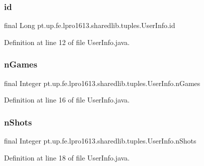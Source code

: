 \subsubsection{\texorpdfstring{id}{id}}
{\footnotesize\ttfamily final Long pt.\+up.\+fe.\+lpro1613.\+sharedlib.\+tuples.\+User\+Info.\+id}



Definition at line 12 of file User\+Info.\+java.

\hypertarget{classpt_1_1up_1_1fe_1_1lpro1613_1_1sharedlib_1_1tuples_1_1_user_info_ace87e94c9ddadfe62cd42182142ee162}{}\label{classpt_1_1up_1_1fe_1_1lpro1613_1_1sharedlib_1_1tuples_1_1_user_info_ace87e94c9ddadfe62cd42182142ee162} 
\subsubsection{\texorpdfstring{n\+Games}{nGames}}
{\footnotesize\ttfamily final Integer pt.\+up.\+fe.\+lpro1613.\+sharedlib.\+tuples.\+User\+Info.\+n\+Games}



Definition at line 16 of file User\+Info.\+java.

\hypertarget{classpt_1_1up_1_1fe_1_1lpro1613_1_1sharedlib_1_1tuples_1_1_user_info_aa892a3fde9c515586fb0218654581100}{}\label{classpt_1_1up_1_1fe_1_1lpro1613_1_1sharedlib_1_1tuples_1_1_user_info_aa892a3fde9c515586fb0218654581100} 
\subsubsection{\texorpdfstring{n\+Shots}{nShots}}
{\footnotesize\ttfamily final Integer pt.\+up.\+fe.\+lpro1613.\+sharedlib.\+tuples.\+User\+Info.\+n\+Shots}



Definition at line 18 of file User\+Info.\+java.

\hypertarget{classpt_1_1up_1_1fe_1_1lpro1613_1_1sharedlib_1_1tuples_1_1_user_info_a7c3c9b1356a8c63c8a8a2ac46d9fde11}{}\label{classpt_1_1up_1_1fe_1_1lpro1613_1_1sharedlib_1_1tuples_1_1_user_info_a7c3c9b1356a8c63c8a8a2ac46d9fde11} 

